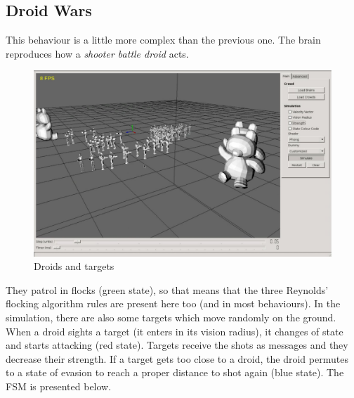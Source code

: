 \newpage
\subsection{Droid Wars}

This behaviour is a little more complex than the previous one. The brain reproduces how a \emph{shooter battle droid} acts. 

\begin{figure}[!h]
  \centering
 \includegraphics[scale=0.5]{droids_01.eps}
  \caption{Droids and targets}
\end{figure}

They patrol in flocks (green state), so that means that the three Reynolds' flocking algorithm rules are present here too (and in most behaviours). In the simulation, there are also some targets which move randomly on the ground. When a droid sights a target (it enters in its vision radius), it changes of state and starts attacking (red state). Targets receive the shots as messages and they decrease their strength. If a target gets too close to a droid, the droid permutes to a state of evasion to reach a proper distance to shot again (blue state). The FSM is presented below.

